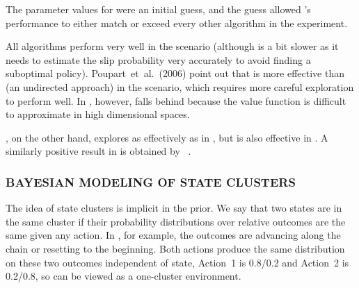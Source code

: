 The parameter values for  were an initial guess, and the guess allowed 's performance to either match or exceed every other algorithm in the experiment.

\begin{table}
\caption{Cumulative reward in ~\cite{asmuth09}}
\label{t:chain}
\end{table}

All algorithms perform very well in the  scenario (although
 is a bit slower as it needs to estimate the slip probability
very accurately to avoid finding a suboptimal policy).
Poupart~et~al.~(2006) point out that  is more effective than  (an undirected approach) in
the  scenario, which requires more careful exploration to perform
well.  In , however,  falls behind because the value function is difficult to approximate in high dimensional spaces. 

, on the other hand, explores as effectively as  in ,
but is also effective in .  A similarly positive result in  is
obtained by ~\cite{strens00}.

\subsubsection{BAYESIAN MODELING OF STATE CLUSTERS}
\label{s:cluster}

The idea of state clusters is implicit in the  prior.
We say that two states are in the same cluster if
their probability distributions over relative outcomes are the same
given any action.  In , for example, the outcomes are advancing along the
chain or resetting to the beginning.  Both actions produce the
same distribution on these two outcomes independent of state, Action~1
is 0.8/0.2 and Action~2 is 0.2/0.8, so  can be viewed as a
one-cluster environment.

